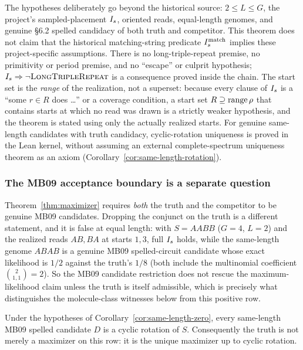The hypotheses deliberately go beyond the historical source: $2 \le L \le G$,
the project's sampled-placement $I_s$, oriented reads, equal-length genomes,
and genuine \S6.2 spelled candidacy of both truth and competitor. This theorem
does not claim that the historical matching-string predicate
$I_s^{\mathrm{match}}$ implies these project-specific assumptions. There is no long-triple-repeat premise, no primitivity or period
premise, and no ``escape'' or culprit hypothesis; $I_s \Rightarrow \neg
\textsc{LongTripleRepeat}$ is a consequence proved inside the chain. The start
set is the \emph{range} of the realization, not a superset: because every clause
of $I_s$ is a ``some $r \in R$ does \dots'' or a coverage condition, a start set
$R \supseteq \operatorname{range}\rho$ that contains starts at which no read was drawn is a
strictly weaker hypothesis, and the theorem is stated using only the actually realized starts.
For genuine same-length candidates with truth candidacy, cyclic-rotation
uniqueness is proved in the Lean kernel, without assuming an external complete-spectrum uniqueness
theorem as an axiom (Corollary~\ref{cor:same-length-rotation}).


\subsubsection{The MB09 acceptance boundary is a separate question}

Theorem~\ref{thm:maximizer} requires \emph{both} the truth and the competitor to
be genuine MB09 candidates. Dropping the conjunct on the truth is a different
statement, and it is false at equal length: with $S=AABB$ ($G=4$, $L=2$) and the
realized reads $AB,BA$ at starts $1,3$, full $I_s$ holds, while the same-length
genome $ABAB$ is a genuine MB09 spelled-circuit candidate whose exact
likelihood is $1/2$ against the truth's $1/8$ (both include the
multinomial coefficient $\binom{2}{1,1}=2$). So the MB09 candidate
restriction does not rescue the maximum-likelihood claim unless the truth is
itself admissible, which is precisely what distinguishes the molecule-class
witnesses below from this positive row.


\begin{corollary}
\label{cor:same-length-rotation}
Under the hypotheses of Corollary~\ref{cor:same-length-zero}, every same-length
MB09 spelled candidate $D$ is a cyclic rotation of $S$. Consequently the
truth is not merely a maximizer on this row: it is the unique maximizer up to
cyclic rotation.
\end{corollary}


